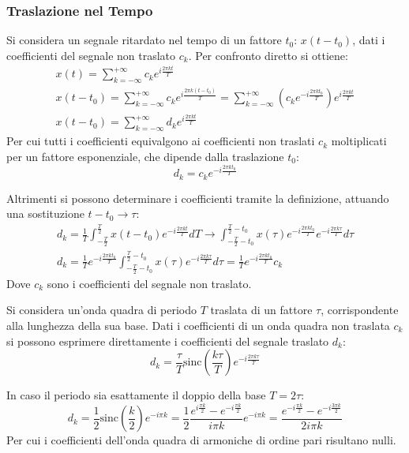 \documentclass{article}
\numberwithin{equation}{subsection}
\begin{document}
\subsubsection{Traslazione nel Tempo}

Si considera un segnale ritardato nel tempo di un fattore $t_0$: $x(t-t_0)$, dati i coefficienti del segnale non traslato $c_k$. Per confronto diretto si ottiene:
\begin{gather*}
    x(t)=\displaystyle\sum_{k=-\infty}^{+\infty}c_ke^{i\frac{2\pi kt}{T}}\\
    x(t-t_0)=\displaystyle\sum_{k=-\infty}^{+\infty}c_ke^{i\frac{2\pi k(t-t_0)}{T}}=\sum_{k=-\infty}^{+\infty}\left(c_ke^{-i\frac{2\pi kt_0}{T}}\right)e^{i\frac{2\pi kt}{T}}\\
    x(t-t_0)=\displaystyle\sum_{k=-\infty}^{+\infty}d_ke^{i\frac{2\pi kt}{T}}
\end{gather*}
Per cui tutti i coefficienti equivalgono ai coefficienti non traslati $c_k$ moltiplicati per un fattore esponenziale, che dipende dalla traslazione $t_0$:
\begin{equation*}
    \displaystyle d_k=c_ke^{-i\frac{2\pi kt_0}{T}}
\end{equation*}

Altrimenti si possono determinare i coefficienti tramite la definizione, attuando una sostituzione $t-t_0\to\tau$:
\begin{gather*}
    d_k=\displaystyle\frac{1}{T}\int_{-\frac{T}{2}}^{\frac{T}{2}}x(t-t_0)e^{-i\frac{2\pi kt}{T}}dT\to\int_{-\frac{T}{2}-t_0}^{\frac{T}{2}-t_0}x(\tau)e^{-i\frac{2\pi kt_0}{T}}e^{-i\frac{2\pi k\tau}{T}}d\tau\\
    d_k=\displaystyle\frac{1}{T}e^{-i\frac{2\pi kt_0}{T}}\int_{-\frac{T}{2}-t_0}^{\frac{T}{2}-t_0}x(\tau)e^{-i\frac{2\pi k\tau}{T}}d\tau=\frac{1}{T}e^{-i\frac{2\pi kt_0}{T}}c_k
\end{gather*}
Dove $c_k$ sono i coefficienti del segnale non traslato. 


Si considera un'onda quadra di periodo $T$ traslata di un fattore $\tau$, corrispondente alla lunghezza della sua base. Dati i coefficienti di un onda quadra non traslata 
$c_k$ si possono esprimere direttamente i coefficienti del segnale traslato $d_k$:
\begin{equation*}
    d_k=\displaystyle\frac{\tau}{T}\mbox{sinc}\left(\frac{k\tau}{T}\right)e^{-i\frac{2\pi k\tau}{T}}
\end{equation*}

In caso il periodo sia esattamente il doppio della base $T=2\tau$:
\begin{equation*}
    d_k=\displaystyle\frac{1}{2}\mbox{sinc}\left(\frac{k}{2}\right)e^{-i\pi k}=\frac{1}{2}\frac{e^{i\frac{\pi k}{2}}-e^{-i\frac{\pi k}{2}}}{i\pi k}e^{-i\pi k}=
    \frac{e^{-i\frac{\pi k}{2}}-e^{-i\frac{3\pi k}{2}}}{2i\pi k}
\end{equation*}
Per cui i coefficienti dell'onda quadra di armoniche di ordine pari risultano nulli. 
\end{document}
